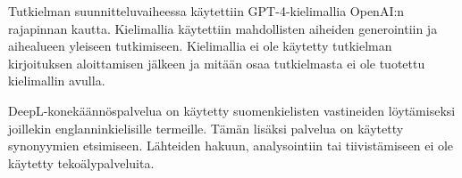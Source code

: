 
Tutkielman suunnitteluvaiheessa käytettiin GPT-4-kielimallia OpenAI:n rajapinnan kautta.
Kielimallia käytettiin mahdollisten aiheiden generointiin ja aihealueen yleiseen tutkimiseen.
Kielimallia ei ole käytetty tutkielman kirjoituksen aloittamisen jälkeen ja mitään osaa tutkielmasta ei ole tuotettu kielimallin avulla.

DeepL-konekäännöspalvelua on käytetty suomenkielisten vastineiden löytämiseksi joillekin englanninkielisille termeille.
Tämän lisäksi palvelua on käytetty synonyymien etsimiseen.
Lähteiden hakuun, analysointiin tai tiivistämiseen ei ole käytetty tekoälypalveluita.

